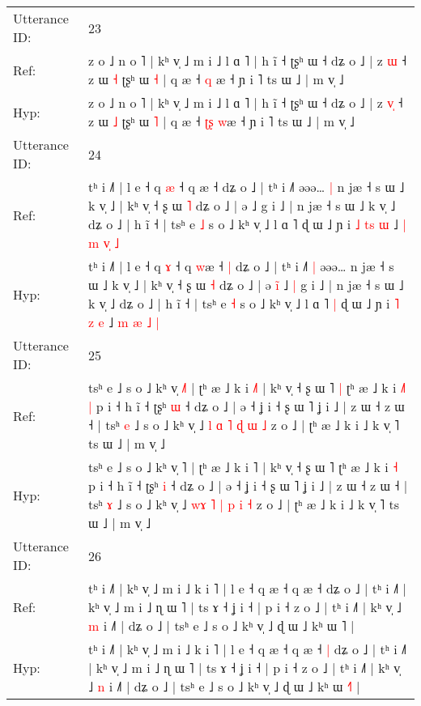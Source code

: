 \documentclass[10pt]{article}
\DeclareRobustCommand{\hl}[1]{{\textcolor{red}{#1}}}
\begin{document}
\begin{longtable}{ll}
\midrule
Utterance ID: & 23 \\
Ref: & z o ˩ n o ˥ | kʰ v̩ ˩ m i ˩ l ɑ ˥ | h ĩ ˧ ʈʂʰ ɯ ˧ dʑ o ˩ | z \hl{}\hl{ɯ} ˧ z ɯ \hl{˧} ʈʂʰ ɯ \hl{˧} | q æ ˧ \hl{}\hl{q} \hl{}æ ˧ ɲ i ˥ ts ɯ ˩ | m v̩ ˩
 \\
Hyp: & z o ˩ n o ˥ | kʰ v̩ ˩ m i ˩ l ɑ ˥ | h ĩ ˧ ʈʂʰ ɯ ˧ dʑ o ˩ | z \hl{v}\hl{̩} ˧ z ɯ \hl{˩} ʈʂʰ ɯ \hl{˥} | q æ ˧ \hl{ʈ}\hl{ʂ} \hl{w}æ ˧ ɲ i ˥ ts ɯ ˩ | m v̩ ˩
 \\
\midrule
Utterance ID: & 24 \\
Ref: & tʰ i ˩˥ | l e ˧ q \hl{æ} ˧ q \hl{}æ ˧\hl{}\hl{} dʑ o ˩ | tʰ i ˩˥\hl{}\hl{} əəə…\hl{ }\hl{|} n jæ ˧ s ɯ ˩ k v̩ ˩ | kʰ v̩ ˧ ʂ ɯ \hl{˥} dʑ o ˩ | ə\hl{}\hl{}\hl{} ˩\hl{}\hl{} g i ˩ | n jæ ˧ s ɯ ˩ k v̩ ˩ dʑ o ˩ | h ĩ ˧ | tsʰ e \hl{˩} s o ˩ kʰ v̩ ˩ l ɑ ˥\hl{}\hl{} ɖ ɯ ˩ ɲ i \hl{˩} \hl{t}\hl{s} \hl{ɯ} ˩ \hl{|} \hl{m} \hl{v}\hl{̩} \hl{˩}
 \\
Hyp: & tʰ i ˩˥ | l e ˧ q \hl{ɤ} ˧ q \hl{w}æ ˧\hl{ }\hl{|} dʑ o ˩ | tʰ i ˩˥\hl{ }\hl{|} əəə…\hl{}\hl{} n jæ ˧ s ɯ ˩ k v̩ ˩ | kʰ v̩ ˧ ʂ ɯ \hl{˧} dʑ o ˩ | ə\hl{ }\hl{i}\hl{̃} ˩\hl{ }\hl{|} g i ˩ | n jæ ˧ s ɯ ˩ k v̩ ˩ dʑ o ˩ | h ĩ ˧ | tsʰ e \hl{˧} s o ˩ kʰ v̩ ˩ l ɑ ˥\hl{ }\hl{|} ɖ ɯ ˩ ɲ i \hl{˥} \hl{}\hl{z} \hl{e} ˩ \hl{m} \hl{æ} \hl{}\hl{˩} \hl{|}
 \\
\midrule
Utterance ID: & 25 \\
Ref: & tsʰ e ˩ s o ˩ kʰ v̩ \hl{˩}˥ | ʈʰ æ ˩ k i \hl{˩}˥ | kʰ v̩ ˧ ʂ ɯ ˥\hl{ }\hl{|} ʈʰ æ ˩ k i\hl{ }\hl{˩}\hl{˥} \hl{|} p i ˧ h ĩ ˧ ʈʂʰ \hl{ɯ} ˧ dʑ o ˩ | ə ˧ ʝ i ˧ ʂ ɯ ˥ ʝ i ˩ | z ɯ ˧ z ɯ ˧ | tsʰ \hl{e} ˩ s o ˩ kʰ v̩ ˩ \hl{}\hl{l} \hl{ɑ} \hl{˥} \hl{ɖ} \hl{ɯ} \hl{˩} z o ˩ | ʈʰ æ ˩ k i ˩ k v̩ ˥ ts ɯ ˩ | m v̩ ˩
 \\
Hyp: & tsʰ e ˩ s o ˩ kʰ v̩ \hl{}˥ | ʈʰ æ ˩ k i \hl{}˥ | kʰ v̩ ˧ ʂ ɯ ˥\hl{}\hl{} ʈʰ æ ˩ k i\hl{}\hl{}\hl{} \hl{˧} p i ˧ h ĩ ˧ ʈʂʰ \hl{i} ˧ dʑ o ˩ | ə ˧ ʝ i ˧ ʂ ɯ ˥ ʝ i ˩ | z ɯ ˧ z ɯ ˧ | tsʰ \hl{ɤ} ˩ s o ˩ kʰ v̩ ˩ \hl{w}\hl{ɤ} \hl{˥} \hl{|} \hl{p} \hl{i} \hl{˧} z o ˩ | ʈʰ æ ˩ k i ˩ k v̩ ˥ ts ɯ ˩ | m v̩ ˩
 \\
\midrule
Utterance ID: & 26 \\
Ref: & tʰ i ˩˥ | kʰ v̩ ˩ m i ˩ k i ˥ | l e ˧ q æ ˧ q æ ˧\hl{}\hl{} dʑ o ˩ | tʰ i ˩˥ | kʰ v̩ ˩ m i ˩ ɳ ɯ ˥ | ts ɤ ˧ ʝ i ˧ | p i ˧ z o ˩ | tʰ i ˩˥ | kʰ v̩ ˩ \hl{m} i ˩˥ | dʑ o ˩ | tsʰ e ˩ s o ˩ kʰ v̩ ˩ ɖ ɯ ˩ kʰ ɯ \hl{}˥ |
 \\
Hyp: & tʰ i ˩˥ | kʰ v̩ ˩ m i ˩ k i ˥ | l e ˧ q æ ˧ q æ ˧\hl{ }\hl{|} dʑ o ˩ | tʰ i ˩˥ | kʰ v̩ ˩ m i ˩ ɳ ɯ ˥ | ts ɤ ˧ ʝ i ˧ | p i ˧ z o ˩ | tʰ i ˩˥ | kʰ v̩ ˩ \hl{n} i ˩˥ | dʑ o ˩ | tsʰ e ˩ s o ˩ kʰ v̩ ˩ ɖ ɯ ˩ kʰ ɯ \hl{˧}˥ |

\end{longtable}
\end{document}
